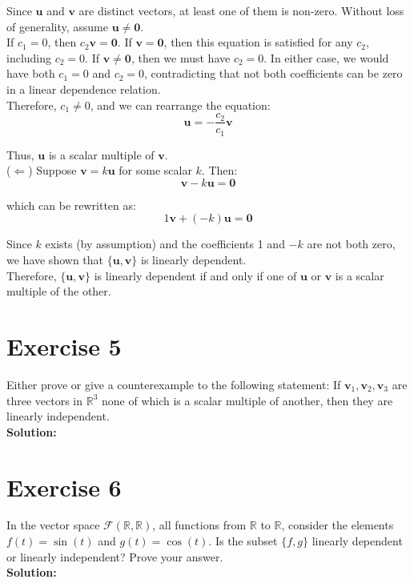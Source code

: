 \documentclass{article}
\begin{document}
Since $\mathbf{u}$ and $\mathbf{v}$ are distinct vectors, at least one of them is non-zero. Without loss of generality, assume $\mathbf{u} \neq \mathbf{0}$. \\

If $c_1 = 0$, then $c_2\mathbf{v} = \mathbf{0}$. If $\mathbf{v} = \mathbf{0}$, then this equation is satisfied for any $c_2$, including $c_2 = 0$. If $\mathbf{v} \neq \mathbf{0}$, then we must have $c_2 = 0$. In either case, we would have both $c_1 = 0$ and $c_2 = 0$, contradicting that not both coefficients can be zero in a linear dependence relation. \\

Therefore, $c_1 \neq 0$, and we can rearrange the equation:
\[\mathbf{u} = -\frac{c_2}{c_1}\mathbf{v}\]

Thus, $\mathbf{u}$ is a scalar multiple of $\mathbf{v}$. \\

($\Leftarrow$) Suppose $\mathbf{v} = k\mathbf{u}$ for some scalar $k$. Then:
\[\mathbf{v} - k\mathbf{u} = \mathbf{0}\]

which can be rewritten as:
\[1\mathbf{v} + (-k)\mathbf{u} = \mathbf{0}\]

Since $k$ exists (by assumption) and the coefficients 1 and $-k$ are not both zero, we have shown that $\{\mathbf{u}, \mathbf{v}\}$ is linearly dependent. \\

Therefore, $\{\mathbf{u}, \mathbf{v}\}$ is linearly dependent if and only if one of $\mathbf{u}$ or $\mathbf{v}$ is a scalar multiple of the other.

\newpage

\section*{Exercise 5}
Either prove or give a counterexample to the following statement: If $\mathbf{v}_1, \mathbf{v}_2, \mathbf{v}_3$ are three vectors in $\mathbb{R}^3$ none of which is a scalar multiple of another, then they are linearly independent. \\

\textbf{Solution:}
\newpage

\section*{Exercise 6}
In the vector space $\mathcal{F}(\mathbb{R},\mathbb{R})$, all functions from $\mathbb{R}$ to $\mathbb{R}$, consider the elements $f(t) = \sin(t)$ and $g(t) = \cos(t)$. Is the subset $\{f,g\}$ linearly dependent or linearly independent? Prove your answer. \\

\textbf{Solution:}
\end{document}
